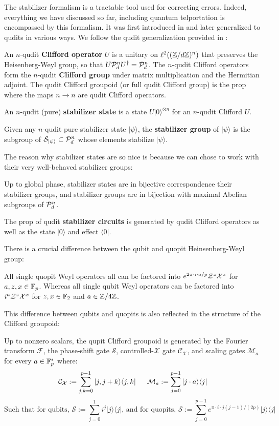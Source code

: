 The stabilizer formalism is a tractable tool used for correcting errors. Indeed, everything we have discussed so far, including quantum telportation is encompassed by this formalism.
It was first introduced in  \cite{gottesman} and later generalized to qudits in various ways.  We follow the qudit generalization provided in \cite{gota}:
\begin{definition}
An $n$-qudit {\bf Clifford operator} $U$ is a unitary on $\ell^2((\mathbb{Z}/d\mathbb{Z})^n)$ that preserves the Heisenberg-Weyl group, so that $U {\cal P}_d^{ n} U^\dag = {\cal P}_d^{ n}$.  The $n$-qudit Clifford operators form the $n$-qudit {\bf Clifford group } under matrix multiplication and the Hermitian adjoint.  The qudit Clifford groupoid (or full qudit Clifford group) is the prop where the maps $n\to n$ are qudit Clifford operators.


An $n$-qudit (pure) {\bf stabilizer state} is a state $ U |0\rangle^{\otimes n}$ for an $n$-qudit Clifford $U$.


Given any $n$-qudit pure stabilizer state $|\psi \rangle$,  the {\bf stabilizer group} of $|\psi \rangle$   is the subgroup of ${\cal S}_{|\psi\rangle} \subset {\cal P}_d^{ n}$  whose elements  stabilize $|\psi\rangle$.
\end{definition}
The reason why stabilizer states are so nice is because we can chose to work with their very well-behaved stabilizer groups:
\begin{lemma}
Up to global phase, stabilizer states are in bijective correspondence their stabilizer groups, and stabilizer groups are in bijection with maximal Abelian subgroups of $ {\cal P}_d^{ n}$.
\end{lemma}
\begin{definition}
The prop of qudit {\bf stabilizer circuits} is generated by qudit Clifford operators as well as the state $|0\rangle$ and effect $\langle 0|$.
\end{definition}
There is a crucial difference between the  qubit and quopit Heinsenberg-Weyl group:
\begin{lemma}
All single quopit Weyl operators all can be factored into
$
e^{2\pi \cdot i\cdot a /p} {\cal Z}^z{\cal X}^x
$ 
for $a,z,x \in \mathbb{F}_p$.
Whereas all single qubit Weyl operators can be factored into 
$
 i^a {\cal Z}^z{\cal X}^x
$
for $z,x \in \mathbb{F}_2$ and $a \in \mathbb{Z}/4\mathbb{Z}$.
\end{lemma}
This difference between qubits and quopits  is also reflected in the structure of the Clifford groupoid:
\begin{lemma}
Up to nonzero scalars, the qupit Clifford groupoid is generated by the Fourier transform $\mathcal F$, the  phase-shift gate $\mathcal S$, controlled-$\mathcal X$ gate $\mathcal{C}_{\mathcal X}$, and scaling gates $\mathcal{M}_a$ for every $a \in \mathbb{F}_p^*$ where:
$$
\mathcal{C}_{\mathcal X}:= \sum_{j,k=0}^{p-1} |j,j+k \rangle \langle j,k |\, \hspace*{.5cm}
\mathcal{M}_a := \sum_{j=0}^{p-1} |j\cdot a \rangle\langle j |
$$ 
$$
\text{Such that for qubits, }
\mathcal{S}:= \sum_{j=0}^{1} i^j |j\rangle\langle j |
\text{, and for quopits, }
\mathcal{S}:= \sum_{j=0}^{p-1} e^{\pi\cdot i \cdot j(j-1)/(2p)} |j\rangle\langle j |
$$
\end{lemma}
